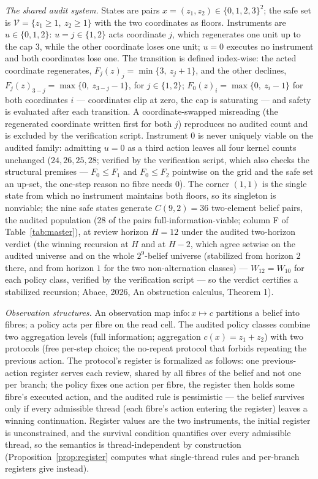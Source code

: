 \documentclass[10pt,twocolumn]{article}
\theoremstyle{definition}
\begin{document}
\emph{The shared audit system.} States are pairs
\(x = (z_1, z_2) \in \{0,1,2,3\}^{2}\); the safe set is
\(\mathcal{V} = \{z_1 \ge 1,\ z_2 \ge 1\}\) with the two coordinates as
floors. Instruments are \(u \in \{0, 1, 2\}\): \(u = j \in \{1,2\}\)
acts coordinate \(j\), which regenerates one unit up to the cap \(3\),
while the other coordinate loses one unit; \(u = 0\) executes no
instrument and both coordinates lose one. The transition is defined index-wise: the acted coordinate regenerates, \(F_j(z)_j = \min\{3,\ z_j + 1\}\), and the other declines, \(F_j(z)_{3-j} = \max\{0,\ z_{3-j} - 1\}\), for \(j \in \{1,2\}\); \(F_0(z)_i = \max\{0,\ z_i - 1\}\) for both coordinates \(i\) --- coordinates clip at zero, the cap is saturating --- and safety is evaluated after each transition. A coordinate-swapped misreading (the regenerated coordinate written first for both \(j\)) reproduces no audited count and is excluded by the verification script. Instrument \(0\) is never uniquely viable on the audited family: admitting \(u = 0\) as a third action leaves all four kernel counts unchanged (\(24, 26, 25, 28\); verified by the verification script, which also checks the structural premises --- \(F_0 \le F_1\) and \(F_0 \le F_2\) pointwise on the grid and the safe set an up-set, the one-step reason no fibre needs \(0\)). The corner \((1,1)\) is the
single state from which no instrument maintains both floors, so its
singleton is nonviable; the nine safe states generate
\(C(9,2) = 36\) two-element belief pairs, the audited population (28 of the pairs full-information-viable; column F of Table~\ref{tab:master}), at review horizon \(H = 12\) under the audited two-horizon verdict (the winning recursion at \(H\) and at \(H - 2\), which agree setwise on the audited universe and on the whole \(2^9\)-belief universe (stabilized from horizon \(2\) there, and from horizon \(1\) for the two non-alternation classes) --- \(W_{12} = W_{10}\) for each policy class, verified by the verification script --- so the verdict certifies a stabilized recursion; Abaee, 2026, An obstruction calculus, Theorem 1).

\emph{Observation structures.} An observation map
\(\mathrm{info}: x \mapsto c\) partitions a belief into fibres; a policy
acts per fibre on the read cell. The audited policy classes combine two
aggregation levels (full information; aggregation
\(c(x) = z_1 + z_2\)) with two protocols (free per-step choice; the
no-repeat protocol that forbids repeating the previous action. The
protocol's register is formalized as follows: one previous-action register
serves each review, shared by all fibres of the belief and not one per
branch; the policy fixes one action per fibre, the register then holds
some fibre's executed action, and the audited rule is pessimistic --- the
belief survives only if every admissible thread (each fibre's action
entering the register) leaves a winning continuation. Register values are
the two instruments, the initial register is unconstrained, and the survival condition quantifies over every
admissible thread, so the semantics is thread-independent by
construction (Proposition~\ref{prop:register} computes what
single-thread rules and per-branch registers give instead).
\end{document}
